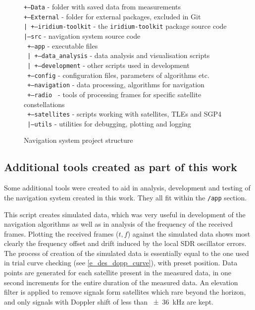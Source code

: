 \begin{figure}
    \begin{framed}
        \raggedright
        \texttt{+---Data} - folder with saved data from measurements \\    
        \texttt{+---External} - folder for external packages, excluded in Git\\
        \texttt{|   +---iridium-toolkit} - the \texttt{iridium-toolkit} package source code\\
        \texttt{|---src} - navigation system source code\\
        \texttt{    +---app} - executable files\\
        \texttt{    |   +---data\_analysis} - data analysis and visualisation scripts\\
        \texttt{    |   +---development} - other scripts used in development\\
        \texttt{    +---config} - configuration files, parameters of algorithms etc.\\
        \texttt{    +---navigation} - data processing, algorithms for navigation\\
        \texttt{    +---radio   } - tools of processing frames for specific satellite constellations\\  
        \texttt{    +---satellites} - scripts working with satellites, TLEs and SGP4\\
        \texttt{    |---utils} - utilities for debugging, plotting and logging\\
    \end{framed}
    \caption{Navigation system project structure}
    \label{f_des_project_structure}
\end{figure}

\subsection{Additional tools created as part of this work}
Some additional tools were created to aid in analysis, development and testing of the navigation system created in this work. They all fit within the \texttt{/app} section.

 This script creates simulated data, which was very useful in development of the navigation algorithms as well as in analysis of the frequency of the received frames. Plotting the received frames ($t, f$) against the simulated data shows most clearly the frequency offset and drift induced by the local SDR oscillator errors. The process of creation of the simulated data is essentially equal to the one used in trial curve checking (see \autoref{e_des_dopp_curve}), with preset position. Data points are generated for each satellite present in the measured data, in one second increments for the entire duration of the measured data. An elevation filter is applied to remove signals form satellites which rare beyond the horizon, and only signals with Doppler shift of less than \qty{\pm36}{kHz} are kept.

